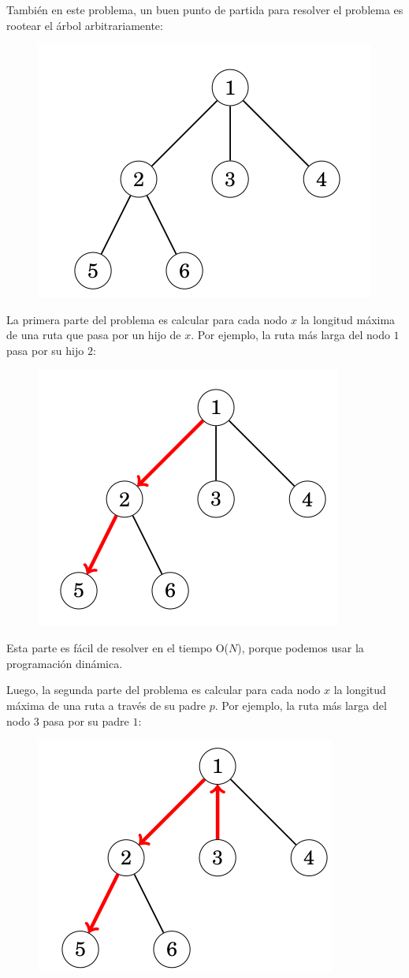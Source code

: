 También en este problema, un buen punto de partida para resolver el problema es rootear el árbol arbitrariamente:
\begin{figure}[h!]
	\centering
	\includegraphics[width=0.4\linewidth]{img/all_longest_paths_2}
	
	\label{fig:alllongestpaths2}
\end{figure}
La primera parte del problema es calcular para cada nodo $x$ la longitud máxima de una ruta que pasa por un hijo de $x$. Por ejemplo, la ruta más larga del nodo $1$ pasa por su hijo $2$:

\begin{figure}[h!]
	\centering
	\includegraphics[width=0.4\linewidth]{img/all_longest_paths_3}
	
	\label{fig:alllongestpaths3}
\end{figure}

Esta parte es fácil de resolver en el tiempo O($N$), porque podemos usar la programación dinámica.

Luego, la segunda parte del problema es calcular para cada nodo $x$ la longitud máxima de una ruta a través de su padre $p$. Por ejemplo, la ruta más larga del nodo $3$ pasa por su padre $1$:

\begin{figure}[h!]
	\centering
	\includegraphics[width=0.4\linewidth]{img/all_longest_paths_4}
	
	\label{fig:alllongestpaths4}
\end{figure}

